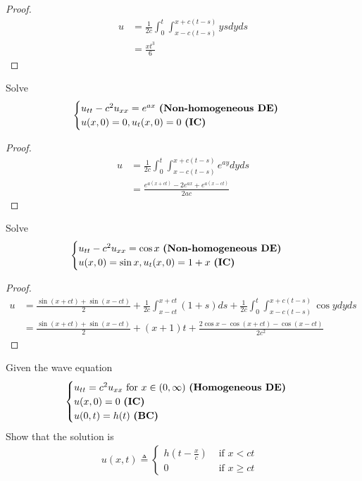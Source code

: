 \documentclass{report}
\begin{document}
\begin{proof}
\begin{align*}
u&=\frac{1}{2c}\int_0^t \int^{x+c(t-s)}_{x-c(t-s)} ysdyds \\
&= \frac{xt^3}{6}
\end{align*}
\end{proof}
\begin{question}{}{}
Solve 
\begin{align*}
\begin{cases}
u_{tt}-c^2u_{xx}=e^{ax}\text{ \textbf{(Non-homogeneous DE)} } \\
u(x,0)=0,u_t(x,0)=0\text{ \textbf{(IC)} }
\end{cases}
\end{align*}
\end{question}
\begin{proof}
\begin{align*}
u&=\frac{1}{2c}\int_0^t \int^{x+c(t-s)}_{x-c(t-s)}e^{ay}dyds \\
&=\frac{e^{a(x+ct)}-2e^{ax}+e^{a(x-ct)}}{2ac}
\end{align*}
\end{proof}
\begin{question}{}{}
Solve 
\begin{align*}
\begin{cases}
u_{tt}-c^2u_{xx}=\cos x\text{ \textbf{(Non-homogeneous DE)} } \\
u(x,0)=\sin x,u_t(x,0)=1+x\text{ \textbf{(IC)} }
\end{cases}
\end{align*}
\end{question}
\begin{proof}
\begin{align*}
u&= \frac{\sin (x+ct)+\sin (x-ct)}{2}+ \frac{1}{2c}\int_{x-ct}^{x+ct} (1+s)ds + \frac{1}{2c}\int_0^t \int_{x-c(t-s)}^{x+c(t-s)}\cos y dyds \\
&=\frac{\sin (x+ct)+\sin (x-ct)}{2}+(x+1)t + \frac{2\cos x- \cos (x+ct)-\cos (x-ct)}{2c^2}
\end{align*}
\end{proof}
\begin{question}{}{}
Given the wave equation 
\begin{align*}
\begin{cases}
  u_{tt}=c^2u_{xx}\text{ for $x\in (0,\infty)$ \textbf{(Homogeneous DE)} }\\
  u(x,0)=0\text{ \textbf{(IC)} }\\
  u(0,t)=h(t)\text{ \textbf{(BC)} }
\end{cases}
\end{align*}
Show that the solution is 
\begin{align*}
u(x,t)\triangleq \begin{cases}
  h(t- \frac{x}{c})& \text{ if $x<ct$ }\\
  0& \text{ if $x\geq ct$ }
\end{cases}
\end{align*}
\end{question}
\end{document}
